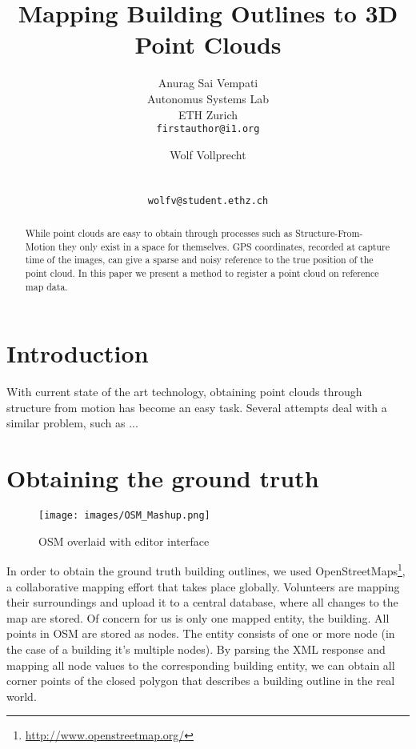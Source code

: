 \documentclass[10pt,twocolumn,letterpaper]{article}
\begin{document}
\title{Mapping Building Outlines to 3D Point Clouds}

\author{Anurag Sai Vempati\\
Autonomus Systems Lab\\ ETH Zurich\\
{\tt\small firstauthor@i1.org}
\and
Wolf Vollprecht\\
\\
\\
{\tt\small wolfv@student.ethz.ch}
}

\maketitle

\begin{abstract}
  While point clouds are easy to obtain through processes such as Structure-From-Motion they only exist in a space for themselves. GPS coordinates, recorded at capture time of the images, can give a sparse and noisy reference to the true position of the point cloud. In this paper we present a method to register a point cloud on reference map data.
\end{abstract}

\section{Introduction}

With current state of  the art technology, obtaining point clouds through structure from motion has become an easy task. 
Several attempts deal with a similar problem, such as ... 

\section{Obtaining the ground truth}

\begin{figure}[h]
   \centering
   \texttt{[image: images/OSM\_Mashup.png]}
   \caption{OSM overlaid with editor interface}
   \label{fig:figure1}
\end{figure}


In order to obtain the ground truth building outlines, we used OpenStreetMaps\footnote{\url{http://www.openstreetmap.org/}}, a collaborative mapping effort that takes place globally. Volunteers are mapping their surroundings and upload it to a central database, where all changes to the map are stored. 
Of concern for us is only one mapped entity, the building. All points in OSM are stored as nodes. The entity consists of one or more node (in the case of a building it's multiple nodes). By parsing the XML response and mapping all node values to the corresponding building entity, we can obtain all corner points of the closed polygon that describes a building outline in the real world.
\end{document}
